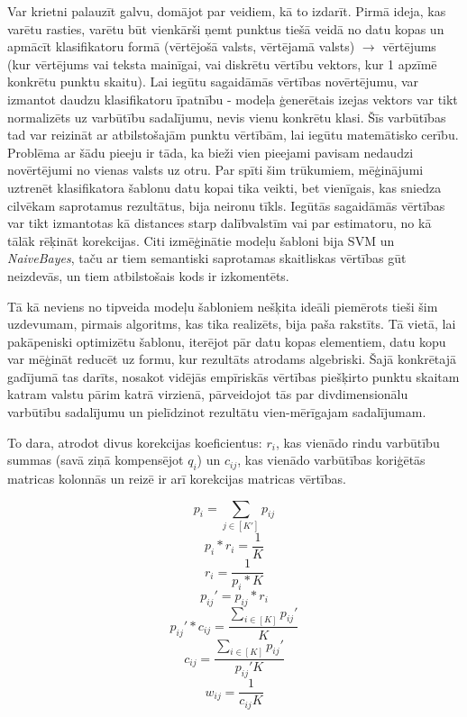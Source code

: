 \documentclass[12pt, a4paper]{article}
\numberwithin{equation}{section} %
\begin{document}
Var krietni palauzīt galvu, domājot par veidiem, kā to izdarīt. Pirmā ideja, kas varētu rasties, varētu būt vienkārši ņemt punktus tiešā veidā no datu kopas un apmācīt klasifikatoru formā (vērtējošā valsts, vērtējamā valsts) $\rightarrow$ vērtējums (kur vērtējums vai teksta mainīgai, vai diskrētu vērtību vektors, kur 1 apzīmē konkrētu punktu skaitu). Lai iegūtu sagaidāmās vērtības novērtējumu, var izmantot daudzu klasifikatoru īpatnību - modeļa ģenerētais izejas vektors var tikt normalizēts uz varbūtību sadalījumu, nevis vienu konkrētu klasi. Šīs varbūtības tad var reizināt ar atbilstošajām punktu vērtībām, lai iegūtu matemātisko cerību. Problēma ar šādu pieeju ir tāda, ka bieži vien pieejami pavisam nedaudzi novērtējumi no vienas valsts uz otru. Par spīti šim trūkumiem, mēģinājumi uztrenēt klasifikatora šablonu datu kopai tika veikti, bet vienīgais, kas sniedza cilvēkam saprotamus rezultātus, bija neironu tīkls. Iegūtās sagaidāmās vērtības var tikt izmantotas kā distances starp dalībvalstīm vai par estimatoru, no kā tālāk rēķināt korekcijas. Citi izmēģinātie modeļu šabloni bija SVM un \textit{NaiveBayes}, taču ar tiem semantiski saprotamas skaitliskas vērtības gūt neizdevās, un tiem atbilstošais kods ir izkomentēts.

Tā kā neviens no tipveida modeļu šabloniem nešķita ideāli piemērots tieši šim uzdevumam, pirmais algoritms, kas tika realizēts, bija paša rakstīts. Tā vietā, lai pakāpeniski optimizētu šablonu, iterējot pār datu kopas elementiem, datu kopu var mēģināt reducēt uz formu, kur rezultāts atrodams algebriski. Šajā konkrētajā gadījumā tas darīts, nosakot vidējās empīriskās vērtības piešķirto punktu skaitam katram valstu pārim katrā virzienā, pārveidojot tās par divdimensionālu varbūtību sadalījumu un pielīdzinot rezultātu vien-mērīgajam sadalījumam. 

To dara, atrodot divus korekcijas koeficientus: $r_i$, kas vienādo rindu varbūtību summas (savā ziņā kompensējot $q_i$) un $c_{ij}$, kas vienādo varbūtības koriģētās matricas kolonnās un reizē ir arī korekcijas matricas vērtības. 

\begin{equation}
    p_i=\sum_{j\in [K']}p_{ij}
\end{equation}
\begin{equation}
    p_i*r_i=\frac{1}{K}
\end{equation}
\begin{equation}
    r_i = \frac{1}{p_i*K}
\end{equation}
\begin{equation}
    p_{ij}'=p_{ij}*r_i
\end{equation}
\begin{equation}
    p_{ij}'*c_{ij}=\frac{\sum_{i\in[K]}p_{ij}'}{K}
\end{equation}
\begin{equation}
    c_{ij}=\frac{\sum_{i\in[K]}p_{ij}'}{p_{ij}'K}
\end{equation}
\begin{equation}
    w_{ij}=\frac{1}{c_{ij}K}
\end{equation}
\end{document}
